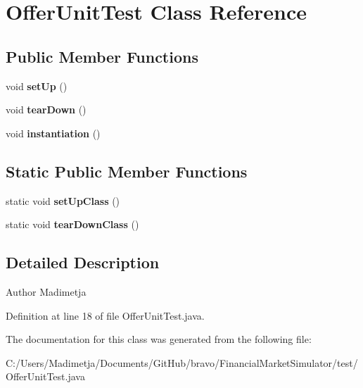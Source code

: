 \hypertarget{class_offer_unit_test}{\section{Offer\+Unit\+Test Class Reference}
\label{class_offer_unit_test}
}
\subsection*{Public Member Functions}
\begin{DoxyCompactItemize}
\item 
\hypertarget{class_offer_unit_test_a491087ff4d8fd6bad517f3e65c6a2c1a}{void {\bfseries set\+Up} ()}\label{class_offer_unit_test_a491087ff4d8fd6bad517f3e65c6a2c1a}

\item 
\hypertarget{class_offer_unit_test_a8e3f348a59b90790bb602bafbe7e2c0d}{void {\bfseries tear\+Down} ()}\label{class_offer_unit_test_a8e3f348a59b90790bb602bafbe7e2c0d}

\item 
\hypertarget{class_offer_unit_test_a6a183dfb778383f20231c0dd4a43dc65}{void {\bfseries instantiation} ()}\label{class_offer_unit_test_a6a183dfb778383f20231c0dd4a43dc65}

\end{DoxyCompactItemize}
\subsection*{Static Public Member Functions}
\begin{DoxyCompactItemize}
\item 
\hypertarget{class_offer_unit_test_a814f87470fbd7747577a8d21a1e31374}{static void {\bfseries set\+Up\+Class} ()}\label{class_offer_unit_test_a814f87470fbd7747577a8d21a1e31374}

\item 
\hypertarget{class_offer_unit_test_afcf0203b47fec4b0899c2e53f2a1a4dc}{static void {\bfseries tear\+Down\+Class} ()}\label{class_offer_unit_test_afcf0203b47fec4b0899c2e53f2a1a4dc}

\end{DoxyCompactItemize}


\subsection{Detailed Description}
\begin{DoxyAuthor}{Author}
Madimetja 
\end{DoxyAuthor}


Definition at line 18 of file Offer\+Unit\+Test.\+java.



The documentation for this class was generated from the following file\+:\begin{DoxyCompactItemize}
\item 
C\+:/\+Users/\+Madimetja/\+Documents/\+Git\+Hub/bravo/\+Financial\+Market\+Simulator/test/Offer\+Unit\+Test.\+java\end{DoxyCompactItemize}
